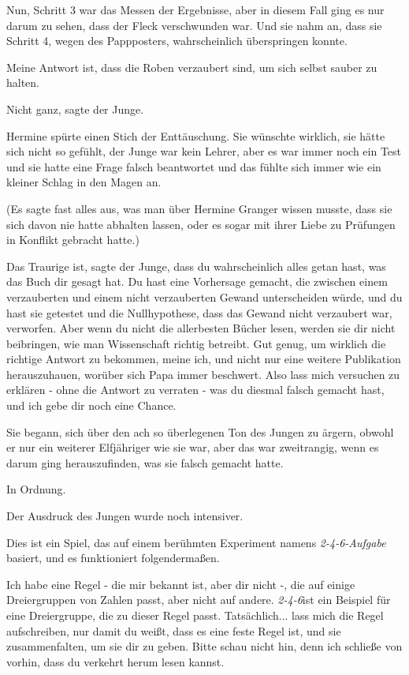 Nun, Schritt 3 war das Messen der Ergebnisse, aber in diesem Fall ging es nur
darum zu sehen, dass der Fleck verschwunden war. Und sie nahm an, dass sie
Schritt 4, wegen des Pappposters, wahrscheinlich überspringen konnte.

\glqq{}Meine Antwort ist, dass die Roben verzaubert sind, um sich selbst sauber
zu halten.\grqq{}

\glqq{}Nicht ganz\grqq{}, sagte der Junge.

Hermine spürte einen Stich der Enttäuschung. Sie wünschte wirklich, sie hätte
sich nicht so gefühlt, der Junge war kein Lehrer, aber es war immer noch ein
Test und sie hatte eine Frage falsch beantwortet und das fühlte sich immer wie
ein kleiner Schlag in den Magen an.

(Es sagte fast alles aus, was man über Hermine Granger wissen musste, dass sie
sich davon nie hatte abhalten lassen, oder es sogar mit ihrer Liebe zu Prüfungen
in Konflikt gebracht hatte.)

\glqq{}Das Traurige ist\grqq{}, sagte der Junge, \glqq{}dass du wahrscheinlich
alles getan hast, was das Buch dir gesagt hat. Du hast eine Vorhersage gemacht,
die zwischen einem verzauberten und einem nicht verzauberten Gewand
unterscheiden würde, und du hast sie getestet und die Nullhypothese, dass das
Gewand nicht verzaubert war, verworfen. Aber wenn du nicht die allerbesten
Bücher lesen, werden sie dir nicht beibringen, wie man Wissenschaft richtig
betreibt. Gut genug, um wirklich die richtige Antwort zu bekommen, meine ich,
und nicht nur eine weitere Publikation herauszuhauen, worüber sich Papa immer
beschwert. Also lass mich versuchen zu erklären - ohne die Antwort zu verraten -
was du diesmal falsch gemacht hast, und ich gebe dir noch eine Chance.\grqq{}

Sie begann, sich über den ach so überlegenen Ton des Jungen zu ärgern, obwohl er
nur ein weiterer Elfjähriger wie sie war, aber das war zweitrangig, wenn es
darum ging herauszufinden, was sie falsch gemacht hatte.

\glqq{}In Ordnung.\grqq{}

Der Ausdruck des Jungen wurde noch intensiver.

\glqq{}Dies ist ein Spiel, das auf einem berühmten Experiment namens
\emph{2-4-6-Aufgabe} basiert, und es funktioniert folgendermaßen.

Ich habe eine Regel - die mir bekannt ist, aber dir nicht -, die auf einige
Dreiergruppen von Zahlen passt, aber nicht auf andere. \emph{2-4-6}ist ein
Beispiel für eine Dreiergruppe, die zu dieser Regel passt. Tatsächlich... lass
mich die Regel aufschreiben, nur damit du weißt, dass es eine feste Regel ist,
und sie zusammenfalten, um sie dir zu geben. Bitte schau nicht hin, denn ich
schließe von vorhin, dass du verkehrt herum lesen kannst.\grqq{}

